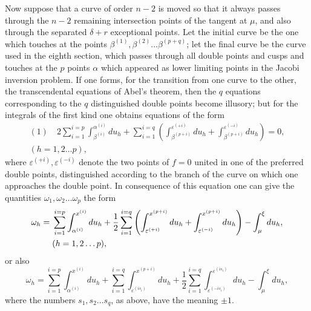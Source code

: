 \documentclass[10pt]{article}
\begin{document}
Now suppose that a curve of order \(n-2\) is moved so that it always passes through the \(n-2\) remaining intersection points of the tangent at \(\mu\), and also through the separated \(\delta+r\) exceptional points. Let the initial curve be the one which touches at the points \(\beta^{(1)},\beta^{(2)}\ldots\beta^{(p+q)}\); let the final curve be the curve used in the eighth section, which passes through all double points and cusps and touches at the \(p\) points \(\alpha\) which appeared as lower limiting points in the Jacobi inversion problem. If one forms, for the transition from one curve to the other, the transcendental equations of Abel's theorem, then the \(q\) equations corresponding to the \(q\) distinguished double points become illusory; but for the integrals of the first kind one obtains equations of the form
\[
\begin{aligned}
(1)\quad
2\sum_{i=1}^{i=p}\int_{\beta^{(i)}}^{\alpha^{(i)}}du_h
+\sum_{i=1}^{i=q}\left(
\int_{\beta^{(p+i)}}^{\varepsilon^{(+i)}}du_h
+\int_{\beta^{(p+i)}}^{\varepsilon^{(-i)}}du_h\right)=0,\\
(h=1,2\ldots p),
\end{aligned}
\]
where \(\varepsilon^{(+i)},\varepsilon^{(-i)}\) denote the two points of \(f=0\) united in one of the preferred double points, distinguished according to the branch of the curve on which one approaches the double point. In consequence of this equation one can give the quantities \(\omega_1,\omega_2\ldots\omega_p\) the form
\[
\begin{aligned}
\omega_h={}&\sum_{i=1}^{i=p}\int_{\alpha^{(i)}}^{x^{(i)}}du_h
+\frac12\sum_{i=1}^{i=q}\left(\int_{\varepsilon^{(+i)}}^{x^{(p+i)}}du_h+
\int_{\varepsilon^{(-i)}}^{x^{(p+i)}}du_h\right)-\int_{\mu}^{\xi}du_h,\\
&\hfill (h=1,2\ldots p),
\end{aligned}
\]
or also
\[
\omega_h=\sum_{i=1}^{i=p}\int_{\alpha^{(i)}}^{x^{(i)}}du_h
+\sum_{i=1}^{i=q}\int_{\varepsilon^{(is_i)}}^{x^{(p+i)}}du_h
+\frac12\sum_{i=1}^{i=q}\int_{\varepsilon^{(-is_i)}}^{\varepsilon^{(is_i)}}du_h
-\int_{\mu}^{\xi}du_h,
\]
where the numbers \(s_1,s_2\ldots s_q\), as above, have the meaning \(\pm1\).
\end{document}
